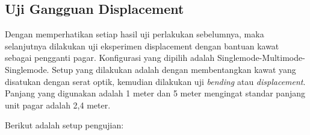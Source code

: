 \documentclass[12pt]{article}
\begin{document}
%	

	\subsection{Uji Gangguan Displacement}
	
	Dengan memperhatikan setiap hasil uji perlakukan sebelumnya, maka selanjutnya dilakukan uji eksperimen displacement dengan bantuan kawat sebagai pengganti pagar. 
	Konfigurasi yang dipilih adalah Singlemode-Multimode-Singlemode.
	Setup yang dilakukan adalah dengan membentangkan kawat yang disatukan dengan serat optik, kemudian dilakukan uji \textit{bending} atau \textit{displacement}.\cite{Tian2017}\cite{Gong2011}\cite{Arifin2015} 
	Panjang yang digunakan adalah 1 meter dan 5 meter mengingat standar panjang unit pagar adalah 2,4 meter.\cite{Pagar2015}
	
	Berikut adalah setup pengujian:
	
\end{document}
